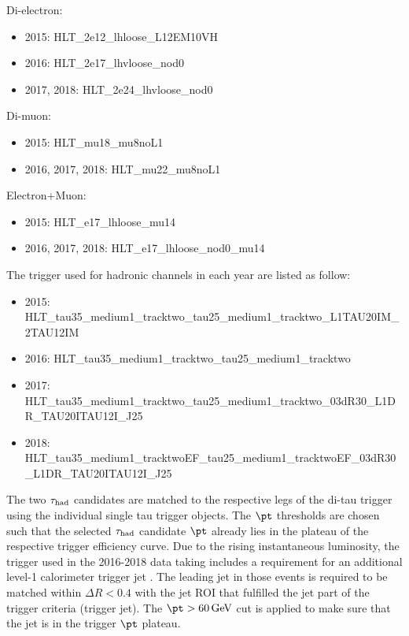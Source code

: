 Di-electron:

\begin{itemize}
\item 2015: HLT\_2e12\_lhloose\_L12EM10VH
\item 2016: HLT\_2e17\_lhvloose\_nod0
\item 2017, 2018: HLT\_2e24\_lhvloose\_nod0
\end{itemize}

Di-muon:

\begin{itemize}
\item 2015: HLT\_mu18\_mu8noL1
\item 2016, 2017, 2018: HLT\_mu22\_mu8noL1
\end{itemize}

Electron+Muon:

\begin{itemize}
\item 2015: HLT\_e17\_lhloose\_mu14
\item 2016, 2017, 2018: HLT\_e17\_lhloose\_nod0\_mu14
\end{itemize}

The trigger used for hadronic channels in each year are listed as follow:
\begin{itemize}
\small
\item 2015: HLT\_tau35\_medium1\_tracktwo\_tau25\_medium1\_tracktwo\_L1TAU20IM\_2TAU12IM
\item 2016: HLT\_tau35\_medium1\_tracktwo\_tau25\_medium1\_tracktwo
\item 2017: HLT\_tau35\_medium1\_tracktwo\_tau25\_medium1\_tracktwo\_03dR30\_L1DR\_TAU20ITAU12I\_J25
\item 2018: HLT\_tau35\_medium1\_tracktwoEF\_tau25\_medium1\_tracktwoEF\_03dR30\_L1DR\_TAU20ITAU12I\_J25

 \end{itemize}

The two $\tau_\text{had}$ candidates are matched to the respective legs of the di-tau trigger using the individual single tau trigger objects. The $\pt$ thresholds are chosen such that the selected $\tau_\text{had}$ candidate $\pt$ already lies in the plateau of the respective trigger efficiency curve. Due to the rising instantaneous luminosity, the trigger used in the 2016-2018 data taking includes a requirement for an additional level-1 calorimeter trigger jet 
. The leading jet in those events is required to be matched within $\Delta R < 0.4$ with the jet ROI that fulfilled the jet part of the trigger criteria (trigger jet). The $\pt > \SI{60}{\GeV}$ cut is applied to make sure that the jet is in the trigger $\pt$ plateau.

